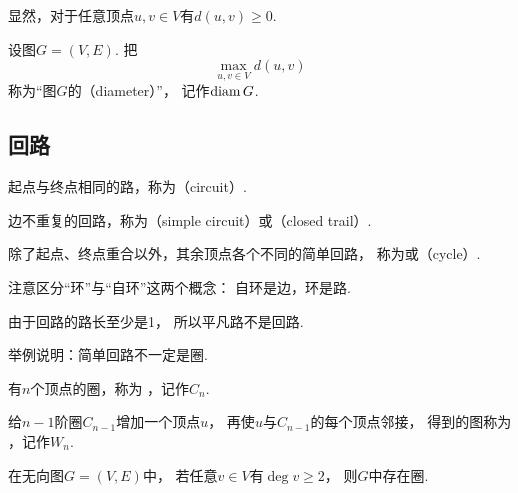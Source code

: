 显然，对于任意顶点\(u,v \in V\)有\(d(u,v) \geq 0\).

\begin{definition}
设图\(G = (V,E)\).
把\begin{equation*}
	\max_{u,v \in V} d(u,v)
\end{equation*}称为“图\(G\)的（diameter）”，
记作\(\operatorname{diam} G\).
\end{definition}

\subsection{回路}
\begin{definition}
起点与终点相同的路，称为（circuit）.
\end{definition}

\begin{definition}
边不重复的回路，称为（simple circuit）或（closed trail）.
\end{definition}

\begin{definition}
除了起点、终点重合以外，其余顶点各个不同的简单回路，
称为或（cycle）.
\end{definition}
\begin{remark}
注意区分“环”与“自环”这两个概念：
自环是边，环是路.
\end{remark}

由于回路的路长至少是1，
所以平凡路不是回路.

\begin{example}
举例说明：简单回路不一定是圈.
\end{example}

\begin{definition}
有\(n\)个顶点的圈，称为 ，记作\(C_n\).
\end{definition}

\begin{definition}
给\(n-1\)阶圈\(C_{n-1}\)增加一个顶点\(u\)，
再使\(u\)与\(C_{n-1}\)的每个顶点邻接，
得到的图称为 ，记作\(W_n\).
\end{definition}

\begin{theorem}
在无向图\(G = (V,E)\)中，
若任意\(v \in V\)有\(\deg v \geq 2\)，
则\(G\)中存在圈.
\end{theorem}

